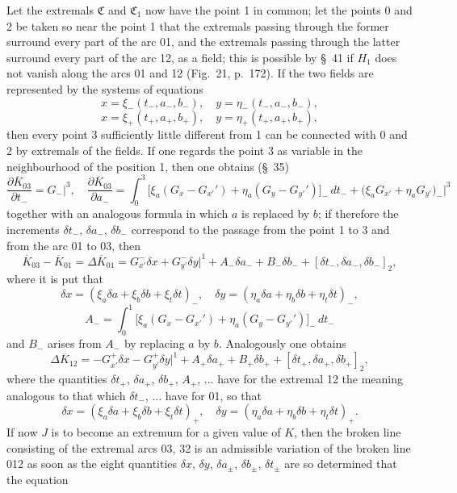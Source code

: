 \documentclass[11pt,a4paper,leqno]{article}
\begin{document}
Let the extremals $\mathfrak C$ and $\mathfrak C_1$ now have the point 1 in common; let the points 0 and 2 be taken so near the point 1 that the extremals passing through the former surround every part of the arc 01, and the extremals passing through the latter surround every part of the arc 12, as a field; this is possible by \S~41 if $H_1$ does not vanish along the arcs 01 and 12 (Fig.~21, p.~172). If the two fields are represented by the systems of equations
\[
 x=\xi_-(t_-,a_-,b_-),\quad y=\eta_-(t_-,a_-,b_-),
\]
\[
 x=\xi_+(t_+,a_+,b_+),\quad y=\eta_+(t_+,a_+,b_+),
\]
then every point 3 sufficiently little different from 1 can be connected with 0 and 2 by extremals of the fields. If one regards the point 3 as variable in the neighbourhood of the position 1, then one obtains (\S~35)
\begin{equation}\tag{10}
\frac{\partial\overline K_{03}}{\partial t_-}=G_-\bigg|^3,
\quad
\frac{\partial\overline K_{03}}{\partial a_-}
=\int_0^3\bigl[\xi_a(G_x-G_{x'}')+\eta_a(G_y-G_{y'}')\bigr]_-\,dt_-
+\bigl(\xi_aG_{x'}+\eta_aG_{y'}\bigr)_-\bigg|^3
\end{equation}
together with an analogous formula in which $a$ is replaced by $b$; if therefore the increments $\delta t_-$, $\delta a_-$, $\delta b_-$ correspond to the passage from the point 1 to 3 and from the arc 01 to 03, then
\[
\overline K_{03}-\overline K_{01}=\Delta\overline K_{01}
=G_{x'}^-\delta x+G_{y'}^-\delta y\bigg|^1
+A_-\delta a_-+B_-\delta b_-+[\delta t_-,\delta a_-,\delta b_-]_2,
\]
where it is put that
\begin{equation}\tag{11}
\delta x=(\xi_a\delta a+\xi_b\delta b+\xi_t\delta t)_-,
\quad
\delta y=(\eta_a\delta a+\eta_b\delta b+\eta_t\delta t)_-,
\end{equation}
\[
A_- =\int_0^1\bigl[\xi_a(G_x-G_{x'}')+\eta_a(G_y-G_{y'}')\bigr]_-\,dt_-
\]
and $B_-$ arises from $A_-$ by replacing $a$ by $b$. Analogously one obtains
\[
\Delta\overline K_{12}
=-G_{x'}^+\delta x-G_{y'}^+\delta y\bigg|^1
+A_+\delta a_+ +B_+\delta b_+ +[\delta t_+,\delta a_+,\delta b_+]_2,
\]
where the quantities $\delta t_+$, $\delta a_+$, $\delta b_+$, $A_+$, $\ldots$ have for the extremal 12 the meaning analogous to that which $\delta t_-$, $\ldots$ have for 01, so that
\begin{equation}\tag{12}
\delta x=(\xi_a\delta a+\xi_b\delta b+\xi_t\delta t)_+,
\quad
\delta y=(\eta_a\delta a+\eta_b\delta b+\eta_t\delta t)_+.
\end{equation}
If now $J$ is to become an extremum for a given value of $K$, then the broken line consisting of the extremal arcs 03, 32 is an admissible variation of the broken line 012 as soon as the eight quantities $\delta x$, $\delta y$, $\delta a_\pm$, $\delta b_\pm$, $\delta t_\pm$ are so determined that the equation
\end{document}
